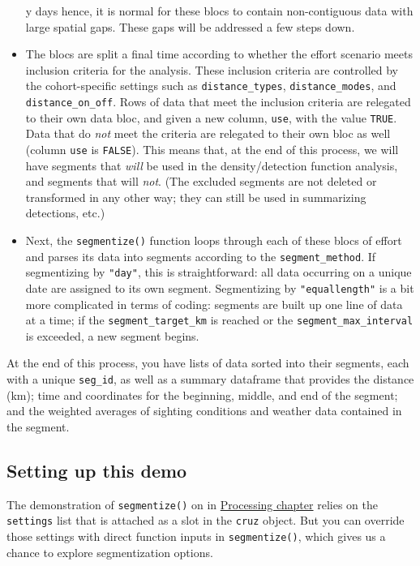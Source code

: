 \documentclass[
]{book}
\begin{document}
\begin{itemize}
y days hence, it is normal for these blocs to contain non-contiguous data with large spatial gaps. These gaps will be addressed a few steps down.
\item
  The blocs are split a final time according to whether the effort scenario meets inclusion criteria for the analysis. These inclusion criteria are controlled by the cohort-specific settings such as \texttt{distance\_types}, \texttt{distance\_modes}, and \texttt{distance\_on\_off}. Rows of data that meet the inclusion criteria are relegated to their own data bloc, and given a new column, \texttt{use}, with the value \texttt{TRUE}. Data that do \emph{not} meet the criteria are relegated to their own bloc as well (column \texttt{use} is \texttt{FALSE}). This means that, at the end of this process, we will have segments that \emph{will} be used in the density/detection function analysis, and segments that will \emph{not}. (The excluded segments are not deleted or transformed in any other way; they can still be used in summarizing detections, etc.)
\item
  Next, the \texttt{segmentize()} function loops through each of these blocs of effort and parses its data into segments according to the \texttt{segment\_method}. If segmentizing by \texttt{"day"}, this is straightforward: all data occurring on a unique date are assigned to its own segment. Segmentizing by \texttt{"equallength"} is a bit more complicated in terms of coding: segments are built up one line of data at a time; if the \texttt{segment\_target\_km} is reached or the \texttt{segment\_max\_interval} is exceeded, a new segment begins.
\end{itemize}

At the end of this process, you have lists of data sorted into their segments, each with a unique \texttt{seg\_id}, as well as a summary dataframe that provides the distance (km); time and coordinates for the beginning, middle, and end of the segment; and the weighted averages of sighting conditions and weather data contained in the segment.

\hypertarget{setting-up-this-demo}{%
\subsection*{Setting up this demo}\label{setting-up-this-demo}}

The demonstration of \texttt{segmentize()} on in \protect\hyperlink{processing}{Processing chapter} relies on the \texttt{settings} list that is attached as a slot in the \texttt{cruz} object. But you can override those settings with direct function inputs in \texttt{segmentize()}, which gives us a chance to explore segmentization options.
\end{document}
